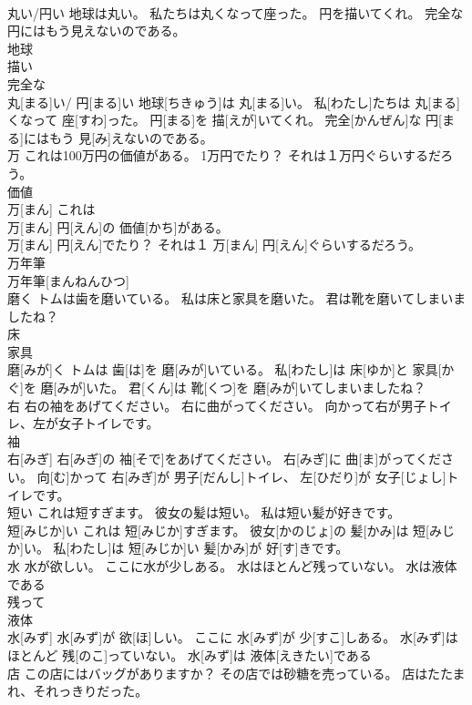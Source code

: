 \documentclass[8pt]{extreport}
\begin{document}
\begin{CJK}{UTF8}{min}
\\	丸い/円い 地球は丸い。 私たちは丸くなって座った。 円を描いてくれ。 完全な円にはもう見えないのである。	
\\	地球 
\\	描い 
\\	完全な 
\\	丸[まる]い/ 円[まる]い 地球[ちきゅう]は 丸[まる]い。 私[わたし]たちは 丸[まる]くなって 座[すわ]った。 円[まる]を 描[えが]いてくれ。 完全[かんぜん]な 円[まる]にはもう 見[み]えないのである。
\\	万 これは100万円の価値がある。 1万円でたり？ それは１万円ぐらいするだろう。	
\\	価値 
\\	万[まん] これは 
\\	万[まん] 円[えん]の 価値[かち]がある。 
\\	万[まん] 円[えん]でたり？ それは１ 万[まん] 円[えん]ぐらいするだろう。
\\	万年筆	
\\	万年筆[まんねんひつ]
\\	磨く トムは歯を磨いている。 私は床と家具を磨いた。 君は靴を磨いてしまいましたね？	
\\	床 
\\	家具 
\\	磨[みが]く トムは 歯[は]を 磨[みが]いている。 私[わたし]は 床[ゆか]と 家具[かぐ]を 磨[みが]いた。 君[くん]は 靴[くつ]を 磨[みが]いてしまいましたね？
\\	右 右の袖をあげてください。 右に曲がってください。 向かって右が男子トイレ、左が女子トイレです。	
\\	袖 
\\	右[みぎ] 右[みぎ]の 袖[そで]をあげてください。 右[みぎ]に 曲[ま]がってください。 向[む]かって 右[みぎ]が 男子[だんし]トイレ、 左[ひだり]が 女子[じょし]トイレです。
\\	短い これは短すぎます。 彼女の髪は短い。 私は短い髪が好きです。	
\\	短[みじか]い これは 短[みじか]すぎます。 彼女[かのじょ]の 髪[かみ]は 短[みじか]い。 私[わたし]は 短[みじか]い 髪[かみ]が 好[す]きです。
\\	水 水が欲しい。 ここに水が少しある。 水はほとんど残っていない。 水は液体である	
\\	残って 
\\	液体 
\\	水[みず] 水[みず]が 欲[ほ]しい。 ここに 水[みず]が 少[すこ]しある。 水[みず]はほとんど 残[のこ]っていない。 水[みず]は 液体[えきたい]である
\\	店 この店にはバッグがありますか？ その店では砂糖を売っている。 店はたたまれ、それっきりだった。	

\end{CJK}
\end{document}
